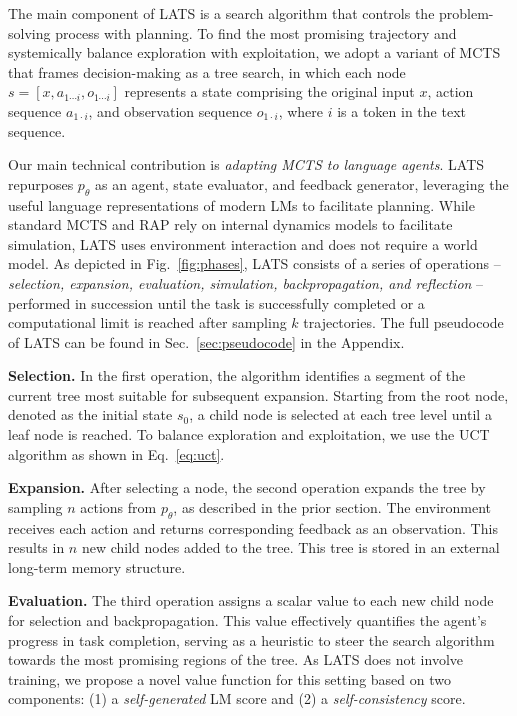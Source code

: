 \documentclass{article}
\theoremstyle{plain}
\theoremstyle{definition}
\theoremstyle{remark}
\begin{document}
The main component of LATS is a search algorithm that controls the problem-solving process with planning. To find the most promising trajectory and systemically balance exploration with exploitation, we adopt a variant of MCTS that frames decision-making as a tree search, in which each node $s=[x, a_{1\cdots i}, o_{1\cdots i}]$ represents a state comprising the original input $x$, action sequence $a_{1\cdot i}$, and observation sequence $o_{1\cdot i}$, where $i$ is a token in the text sequence. 

Our main technical contribution is \textit{adapting MCTS to language agents}. LATS repurposes $p_\theta$ as an agent, state evaluator, and feedback generator, leveraging the useful language representations of modern LMs to facilitate planning. While standard MCTS and RAP \cite{hao2023reasoning} rely on internal dynamics models to facilitate simulation, LATS uses environment interaction and does not require a world model. As depicted in Fig.~\ref{fig:phases}, LATS consists of a series of operations -- \textit{selection, expansion, evaluation, simulation, backpropagation, and reflection} -- performed in succession until the task is successfully completed or a computational limit is reached after sampling $k$ trajectories. The full pseudocode of LATS can be found in Sec.~\ref{sec:pseudocode} in the Appendix.

\textbf{Selection.}
In the first operation, the algorithm identifies a segment of the current tree most suitable for subsequent expansion. Starting from the root node, denoted as the initial state \(s_0\), a child node is selected at each tree level until a leaf node is reached. To balance exploration and exploitation, we use the UCT algorithm as shown in Eq.~\ref{eq:uct}. 

\vspace{0.5mm}
\textbf{Expansion.} 
After selecting a node, the second operation expands the tree by sampling $n$ actions from $p_\theta$, as described in the prior section. The environment receives each action and returns corresponding feedback as an observation. This results in $n$ new child nodes added to the tree. This tree is stored in an external long-term memory structure.

\vspace{0.5mm}
\textbf{Evaluation.} 
The third operation assigns a scalar value to each new child node for selection and backpropagation. This value effectively quantifies the agent's progress in task completion, serving as a heuristic to steer the search algorithm towards the most promising regions of the tree. As LATS does not involve training, we propose a novel value function for this setting based on two components: (1) a \emph{self-generated} LM score and (2) a \emph{self-consistency} score.
\end{document}
